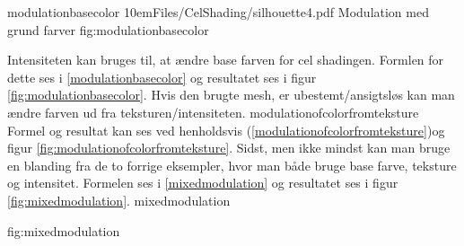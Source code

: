  {modulationbasecolor} 
 {10em}{Files/CelShading/silhouette4.pdf} {Modulation med grund farver} {fig:modulationbasecolor}


Intensiteten kan bruges til, at ændre base farven for cel shadingen. Formlen for dette ses i \ref{modulationbasecolor} og resultatet ses i figur \ref{fig:modulationbasecolor}. 
Hvis den brugte mesh, er ubestemt/ansigtsløs kan man ændre farven ud fra teksturen/intensiteten. 
 {modulationofcolorfromteksture}
Formel og resultat kan ses ved henholdsvis (\ref{modulationofcolorfromteksture})og figur \ref{fig:modulationofcolorfromteksture}. Sidst, men ikke mindst kan man bruge en blanding fra de to forrige eksempler, hvor man både bruge base farve, teksture og intensitet. Formelen ses i \ref{mixedmodulation} og resultatet ses i figur \ref{fig:mixedmodulation}.
 {mixedmodulation}
\newpage{}

 {fig:mixedmodulation}
 
